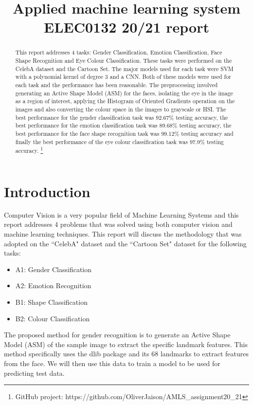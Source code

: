 \documentclass{article}
\title{Applied machine learning system ELEC0132 20/21 report}
\begin{document}
%
\maketitle
%
\begin{abstract}
    This report addresses 4 tasks: Gender Classification, Emotion Classification, Face Shape Recognition and Eye Colour Classification. These tasks were performed on the CelebA dataset and the Cartoon Set. The major models used for each task were SVM with a polynomial kernel of degree 3 and a CNN. Both of these models were used for each task and the performance has been reasonable. The preprocessing involved generating an Active Shape Model (ASM) for the faces, isolating the eye in the image as a region of interest, applying the Histogram of Oriented Gradients operation on the images and also converting the colour space in the images to grayscale or HSI. The best performance for the gender classification task was 92.67\% testing accuracy, the best performance for the emotion classification task was 89.68\% testing accuracy, the best performance for the face shape recognition task was 99.12\% testing accuracy and finally the best performance of the eye colour classification task was 97.9\% testing accuracy.  \footnote{GitHub project: https://github.com/OliverJaison/AMLS\_assignment20\_21}
\end{abstract}
%

%

\section{Introduction}
\label{sec:intro}
    Computer Vision is a very popular field of Machine Learning Systems and this report addresses 4 problems that was solved using both computer vision and machine learning techniques. This report will discuss the methodology that was adopted on the ``CelebA" dataset and the ``Cartoon Set" dataset for the following tasks:
    \begin{itemize}
    	\item A1: Gender Classification
    	\item A2: Emotion Recognition
    	\item B1: Shape Classification
    	\item B2: Colour Classification
    \end{itemize}

    The proposed method for gender recognition is to generate an Active Shape Model (ASM) of the sample image to extract the specific landmark features. This method specifically uses the dlib package and its 68 landmarks to extract features from the face. We will then use this data to train a model to be used for predicting test data.\\
    
\end{document}
